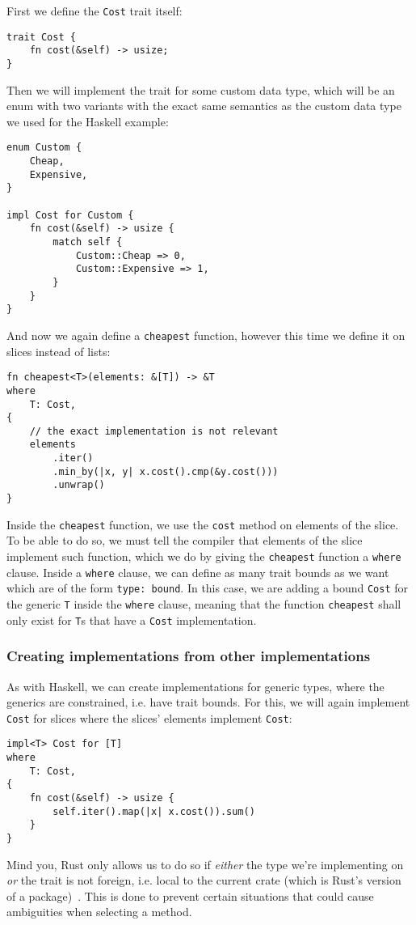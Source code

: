First we define the \verb|Cost| trait itself:
\begin{verbatim}
trait Cost {
    fn cost(&self) -> usize;
}
\end{verbatim}
Then we will implement the trait for some custom data type, which will be an enum with two variants with the exact same semantics as the custom data type we used for the Haskell example:
\begin{verbatim}
enum Custom {
    Cheap,
    Expensive,
}

impl Cost for Custom {
    fn cost(&self) -> usize {
        match self {
            Custom::Cheap => 0,
            Custom::Expensive => 1,
        }
    }
}
\end{verbatim}
And now we again define a \verb|cheapest| function, however this time we define it on slices instead of lists:
\begin{verbatim}
fn cheapest<T>(elements: &[T]) -> &T
where
    T: Cost,
{
    // the exact implementation is not relevant
    elements
        .iter()
        .min_by(|x, y| x.cost().cmp(&y.cost()))
        .unwrap()
}
\end{verbatim}
Inside the \verb|cheapest| function, we use the \verb|cost| method on elements of the slice. To be able to do so, we must tell the compiler that elements of the slice implement such function, which we do by giving the \verb|cheapest| function a \verb|where| clause. Inside a \verb|where| clause, we can define as many trait bounds as we want which are of the form \verb|type: bound|. In this case, we are adding a bound \verb|Cost| for the generic \verb|T| inside the \verb|where| clause, meaning that the function \verb|cheapest| shall only exist for \verb|T|s that have a \verb|Cost| implementation.

\subsubsection{Creating implementations from other implementations}

As with Haskell, we can create implementations for generic types, where the generics are constrained, i.e. have trait bounds. For this, we will again implement \verb|Cost| for slices where the slices' elements implement \verb|Cost|:
\begin{verbatim}
impl<T> Cost for [T]
where
    T: Cost,
{
    fn cost(&self) -> usize {
        self.iter().map(|x| x.cost()).sum()
    }
}
\end{verbatim}
Mind you, Rust only allows us to do so if \textit{either} the type we're implementing on \textit{or} the trait is not foreign, i.e. local to the current crate (which is Rust's version of a package)~\cite{rust-book}. This is done to prevent certain situations that could cause ambiguities when selecting a method.

